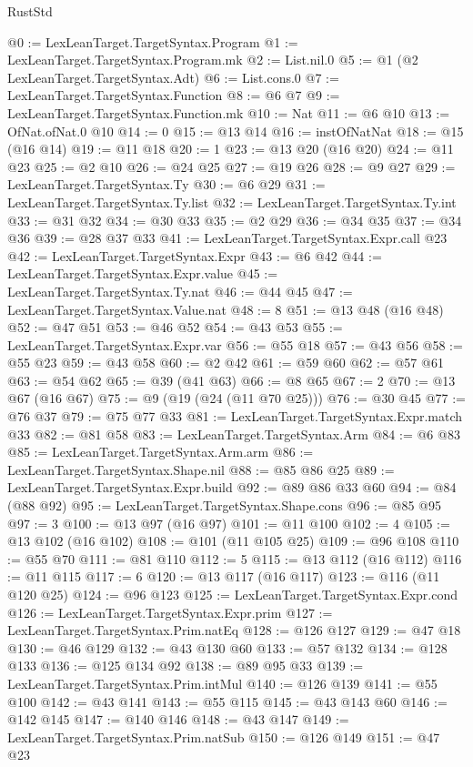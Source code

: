 \begin{lexlean}{RustStd}
\begin{coremodule}
@0 := LexLeanTarget.TargetSyntax.Program
@1 := LexLeanTarget.TargetSyntax.Program.mk
@2 := List.nil.{0}
@5 := @1 (@2 LexLeanTarget.TargetSyntax.Adt)
@6 := List.cons.{0}
@7 := LexLeanTarget.TargetSyntax.Function
@8 := @6 @7
@9 := LexLeanTarget.TargetSyntax.Function.mk
@10 := Nat
@11 := @6 @10
@13 := OfNat.ofNat.{0} @10
@14 := 0
@15 := @13 @14
@16 := instOfNatNat
@18 := @15 (@16 @14)
@19 := @11 @18
@20 := 1
@23 := @13 @20 (@16 @20)
@24 := @11 @23
@25 := @2 @10
@26 := @24 @25
@27 := @19 @26
@28 := @9 @27
@29 := LexLeanTarget.TargetSyntax.Ty
@30 := @6 @29
@31 := LexLeanTarget.TargetSyntax.Ty.list
@32 := LexLeanTarget.TargetSyntax.Ty.int
@33 := @31 @32
@34 := @30 @33
@35 := @2 @29
@36 := @34 @35
@37 := @34 @36
@39 := @28 @37 @33
@41 := LexLeanTarget.TargetSyntax.Expr.call @23
@42 := LexLeanTarget.TargetSyntax.Expr
@43 := @6 @42
@44 := LexLeanTarget.TargetSyntax.Expr.value
@45 := LexLeanTarget.TargetSyntax.Ty.nat
@46 := @44 @45
@47 := LexLeanTarget.TargetSyntax.Value.nat
@48 := 8
@51 := @13 @48 (@16 @48)
@52 := @47 @51
@53 := @46 @52
@54 := @43 @53
@55 := LexLeanTarget.TargetSyntax.Expr.var
@56 := @55 @18
@57 := @43 @56
@58 := @55 @23
@59 := @43 @58
@60 := @2 @42
@61 := @59 @60
@62 := @57 @61
@63 := @54 @62
@65 := @39 (@41 @63)
@66 := @8 @65
@67 := 2
@70 := @13 @67 (@16 @67)
@75 := @9 (@19 (@24 (@11 @70 @25)))
@76 := @30 @45
@77 := @76 @37
@79 := @75 @77 @33
@81 := LexLeanTarget.TargetSyntax.Expr.match @33
@82 := @81 @58
@83 := LexLeanTarget.TargetSyntax.Arm
@84 := @6 @83
@85 := LexLeanTarget.TargetSyntax.Arm.arm
@86 := LexLeanTarget.TargetSyntax.Shape.nil
@88 := @85 @86 @25
@89 := LexLeanTarget.TargetSyntax.Expr.build
@92 := @89 @86 @33 @60
@94 := @84 (@88 @92)
@95 := LexLeanTarget.TargetSyntax.Shape.cons
@96 := @85 @95
@97 := 3
@100 := @13 @97 (@16 @97)
@101 := @11 @100
@102 := 4
@105 := @13 @102 (@16 @102)
@108 := @101 (@11 @105 @25)
@109 := @96 @108
@110 := @55 @70
@111 := @81 @110
@112 := 5
@115 := @13 @112 (@16 @112)
@116 := @11 @115
@117 := 6
@120 := @13 @117 (@16 @117)
@123 := @116 (@11 @120 @25)
@124 := @96 @123
@125 := LexLeanTarget.TargetSyntax.Expr.cond
@126 := LexLeanTarget.TargetSyntax.Expr.prim
@127 := LexLeanTarget.TargetSyntax.Prim.natEq
@128 := @126 @127
@129 := @47 @18
@130 := @46 @129
@132 := @43 @130 @60
@133 := @57 @132
@134 := @128 @133
@136 := @125 @134 @92
@138 := @89 @95 @33
@139 := LexLeanTarget.TargetSyntax.Prim.intMul
@140 := @126 @139
@141 := @55 @100
@142 := @43 @141
@143 := @55 @115
@145 := @43 @143 @60
@146 := @142 @145
@147 := @140 @146
@148 := @43 @147
@149 := LexLeanTarget.TargetSyntax.Prim.natSub
@150 := @126 @149
@151 := @47 @23

\end{coremodule}
\end{lexlean}
